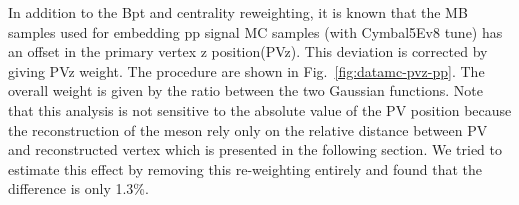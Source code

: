 In addition to the Bpt and centrality reweighting, it is known that the MB samples used for embedding pp signal MC samples (with Cymbal5Ev8 tune) has an offset in the primary vertex z position(PVz).
This deviation is corrected by giving PVz weight. The procedure are shown in Fig.~\ref{fig:datamc-pvz-pp}.
The overall weight is given by the ratio between the two Gaussian functions.
Note that this analysis is not sensitive to the absolute value of the PV position because the reconstruction of the \Bplus meson rely only on the relative distance between PV and \Bplus reconstructed vertex which is presented in the following section.
We tried to estimate this effect by removing this re-weighting entirely and found that the difference is only 1.3\%.


\clearpage

